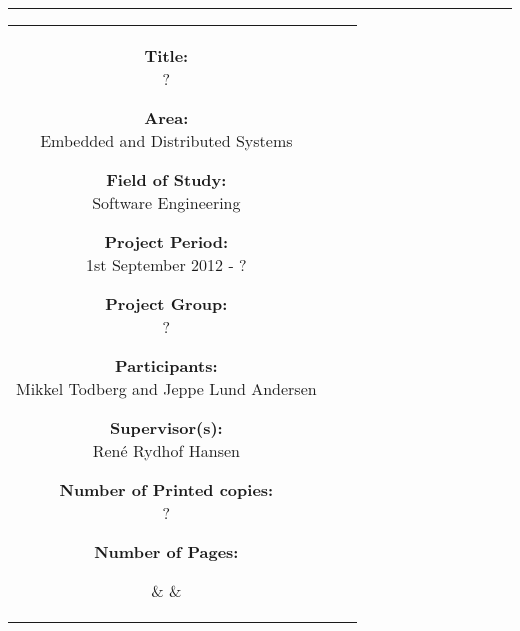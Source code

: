 \begin{titlepage}

\begin{center}
\begin{tabular}{c}
\end{tabular}
\end{center}
\vspace{-3mm}
\hrule

\vspace{5mm}

\hspace{-10mm}
\begin{tabular}{ccc}

\parbox{55mm}{
  \footnotesize
  \begin{description}
  
  \item{\textbf{Title:}          \\ ?}
  \item{\textbf{Area:}           \\ Embedded and Distributed Systems}
  \item{\textbf{Field of Study:} \\ Software Engineering}
  \item{\textbf{Project Period:} \\ 1st September 2012 - ?}
  \item{\textbf{Project Group:}  \\ ?}
  \item{\textbf{Participants:}   \\ Mikkel Todberg and Jeppe Lund Andersen}
  \item{\textbf{Supervisor(s):}  \\ René Rydhof Hansen}

  \item{\textbf{Number of Printed copies:} \\ ?}
  \item{\textbf{Number of Pages:} \\ \pageref{LastPage}}

  \end{description}
}

&
\hspace{5mm}
&

\fbox{
  \parbox{56mm}{
    \footnotesize
    
  }
}

\end{tabular}

\end{titlepage}
